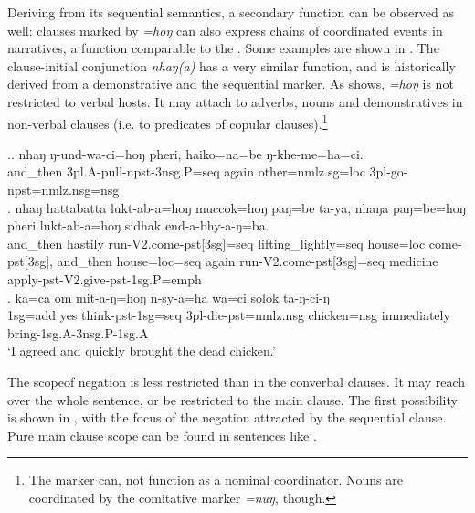 	
	
Deriving from its sequential semantics, a secondary function can be observed as well: clauses marked by \emph{=hoŋ} can also express chains of coordinated events in narratives, a function comparable to the  \citep{Nedjalkov1995Some}.  Some examples are shown in \Next. The clause-initial conjunction \emph{nhaŋ(a)} has a very similar function, and is historically derived from a demonstrative and the sequential marker. As \Next[b] shows, \emph{=hoŋ} is not restricted to verbal hosts. It may attach to adverbs, nouns and demonstratives in non-verbal clauses (i.e. to predicates of copular clauses).\footnote{The marker can, not function as a nominal coordinator. Nouns are coordinated by the comitative marker \emph{=nuŋ}, though.}

	\ex.\ag. nhaŋ    ŋ-und-wa-ci=hoŋ                   pheri, haiko=na=be           ŋ-khe-me=ha=ci.\\
		and\_then {\sc 3pl.A-}pull{\sc -npst-3nsg.P=seq} again other{\sc =nmlz.sg=loc} {\sc 3pl-}go{\sc -npst=nmlz.nsg=nsg}\\
		 
\bg. nhaŋ hattabatta   lukt-ab-a=hoŋ muccok=hoŋ paŋ=be ta-ya, nhaŋa    paŋ=be=hoŋ pheri lukt-ab-a=hoŋ sidhak end-a-bhy-a-ŋ=ba.\\
	and\_then hastily run{\sc -V2.come-pst[3sg]=seq} lifting\_lightly{\sc =seq} house{\sc =loc} come{\sc -pst[3sg]}, and\_then house{\sc =loc=seq}  again run{\sc -V2.come-pst[3sg]=seq}  medicine apply{\sc -pst-V2.give-pst-1sg.P=emph}\\
 
\bg.	ka=ca    om  mit-a-ŋ=hoŋ       n-sy-a=ha              wa=ci             solok       ta-ŋ-ci-ŋ\\
		{\sc 1sg=add} yes think{\sc -pst-1sg=seq} {\sc 3pl-}die{\sc -pst=nmlz.nsg} chicken={\sc nsg} immediately bring{\sc [pst]-1sg.A-3nsg.P-1sg.A}\\
		‘I agreed and quickly brought the dead chicken.’ 
		

The scopeof negation  is less restricted than in the converbal clauses. It may reach over  the whole sentence, or be restricted to the main clause. The first possibility is shown in \Next[a], with the focus of the negation attracted by the sequential clause. Pure main clause scope can be found in sentences like \Next[b]. 


